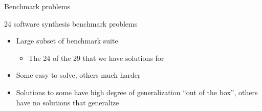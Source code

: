 \documentclass{beamer}
\begin{document}
\begin{frame}{Benchmark problems}

24 software synthesis benchmark problems
\begin{itemize}
	\item Large subset of benchmark suite~\cite{Helmuth:2015:GECCO}
	\begin{itemize}
		\item The 24 of the 29 that we have solutions for
	\end{itemize}
	\item Some easy to solve, others much harder
	\item Solutions to some have high degree of generalization ``out of the box'', others have no solutions that generalize
\end{itemize}


\end{frame}
\end{document}
